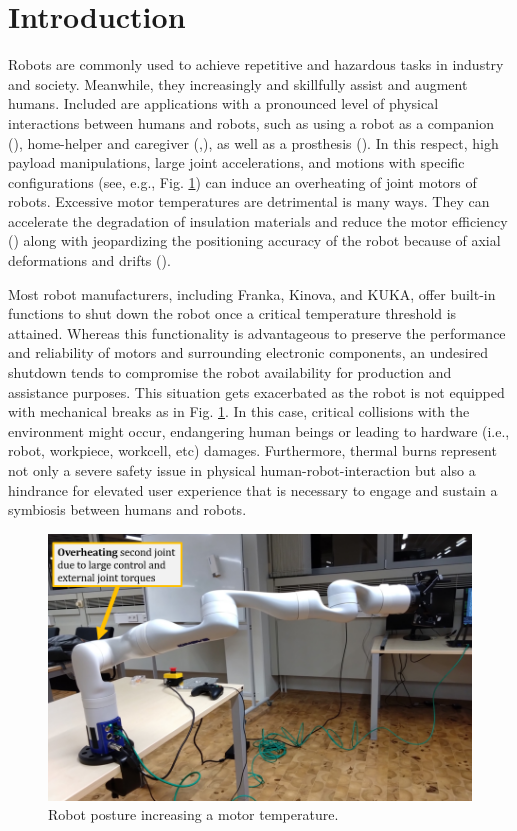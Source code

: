 \documentclass{ifacconf}
\begin{document}
\section{Introduction}
Robots are commonly used to  achieve repetitive and hazardous tasks in industry and society. Meanwhile, they increasingly and skillfully assist and augment humans. Included are  applications with a pronounced level of physical interactions between humans and robots, such as using a robot as a companion (\cite{basha2025robotic}), home-helper and caregiver (\cite{tsui2025exploring},\cite{gkiolnta2025challenges}), as well as a prosthesis (\cite{kim2025mode}). In this respect, high payload manipulations, large joint accelerations, and motions with specific configurations (see, e.g., Fig. \ref{fig:intro}) can induce an overheating of  joint motors of robots. Excessive motor temperatures are detrimental is many ways. They can accelerate the degradation of insulation materials and reduce the motor efficiency (\cite{yehorov2025study}) along with jeopardizing the positioning accuracy of the robot because of axial  deformations and drifts (\cite{soga2024skillful}). 



Most robot manufacturers, including Franka, Kinova, and KUKA, offer built-in functions to shut down the robot once a critical temperature threshold is attained. Whereas this functionality is advantageous to preserve the performance and reliability of motors and surrounding electronic components, an undesired shutdown tends to compromise the robot availability for production and assistance purposes. This situation gets exacerbated as the robot is not equipped with mechanical breaks as in Fig. \ref{fig:intro}. In this case, critical collisions with the environment might occur, endangering human beings or leading to hardware (i.e., robot, workpiece, workcell, etc) damages. Furthermore, thermal burns represent  not only  a severe safety issue in physical human-robot-interaction but also a hindrance for elevated user experience that is necessary to engage and sustain a symbiosis between humans and robots.

\begin{figure}[t]
	\centerline{\includegraphics[width=0.97\columnwidth]{pictures/intro.png}}
	\caption{Robot posture increasing a motor temperature.}
	\label{fig:intro}
\end{figure}
\end{document}
